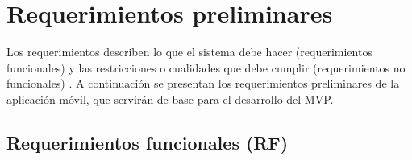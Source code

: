 
\section{Requerimientos preliminares}

Los requerimientos describen lo que el sistema debe hacer (requerimientos
funcionales) y las restricciones o cualidades que debe cumplir
(requerimientos no funcionales) \citep{sommerville2011, kendall2011}. A
continuaci\'on se presentan los requerimientos preliminares de la aplicaci\'on
m\'ovil, que servir\'an de base para el desarrollo del MVP.

\subsection{Requerimientos funcionales (RF)}

